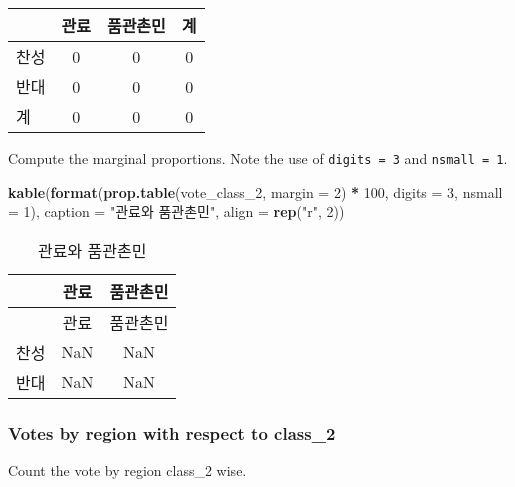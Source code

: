 \documentclass[
]{article}
\newenvironment{Shaded}{\begin{snugshade}}{\end{snugshade}}
\newcommand{\DataTypeTok}[1]{\textcolor[rgb]{0.13,0.29,0.53}{#1}}
\newcommand{\DecValTok}[1]{\textcolor[rgb]{0.00,0.00,0.81}{#1}}
\newcommand{\KeywordTok}[1]{\textcolor[rgb]{0.13,0.29,0.53}{\textbf{#1}}}
\newcommand{\NormalTok}[1]{#1}
\newcommand{\OperatorTok}[1]{\textcolor[rgb]{0.81,0.36,0.00}{\textbf{#1}}}
\newcommand{\OtherTok}[1]{\textcolor[rgb]{0.56,0.35,0.01}{#1}}
\newcommand{\StringTok}[1]{\textcolor[rgb]{0.31,0.60,0.02}{#1}}
\begin{document}
\begin{longtable}[]{@{}lccc@{}}
\toprule
& 관료 & 품관촌민 & 계\tabularnewline
\midrule
\endhead
찬성 & 0 & 0 & 0\tabularnewline
반대 & 0 & 0 & 0\tabularnewline
계 & 0 & 0 & 0\tabularnewline
\bottomrule
\end{longtable}

Compute the marginal proportions. Note the use of \texttt{digits\ =\ 3}
and \texttt{nsmall\ =\ 1}.

\begin{Shaded}
\begin{Highlighting}[]
\KeywordTok{kable}\NormalTok{(}\KeywordTok{format}\NormalTok{(}\KeywordTok{prop.table}\NormalTok{(vote\_class\_}\DecValTok{2}\NormalTok{, }\DataTypeTok{margin =} \DecValTok{2}\NormalTok{) }\OperatorTok{*}\StringTok{ }\DecValTok{100}\NormalTok{, }
             \DataTypeTok{digits =} \DecValTok{3}\NormalTok{, }\DataTypeTok{nsmall =} \DecValTok{1}\NormalTok{), }
      \DataTypeTok{caption =} \StringTok{"관료와 품관촌민"}\NormalTok{, }
      \DataTypeTok{align =} \KeywordTok{rep}\NormalTok{(}\StringTok{"r"}\NormalTok{, }\DecValTok{2}\NormalTok{))}
\end{Highlighting}
\end{Shaded}

\begin{longtable}[]{@{}lcc@{}}
\caption{관료와 품관촌민}\tabularnewline
\toprule
& 관료 & 품관촌민\tabularnewline
\midrule
\endfirsthead
\toprule
& 관료 & 품관촌민\tabularnewline
\midrule
\endhead
찬성 & NaN & NaN\tabularnewline
반대 & NaN & NaN\tabularnewline
\bottomrule
\end{longtable}

\hypertarget{votes-by-region-with-respect-to-class_2}{%
\subsubsection{Votes by region with respect to
class\_2}\label{votes-by-region-with-respect-to-class_2}}

Count the vote by region class\_2 wise.

\begin{Shaded}
\end{Shaded}
\end{document}
